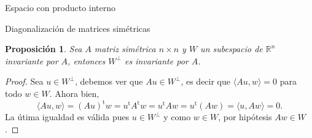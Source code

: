 \documentclass[a4paper,12pt,twoside,spanish]{amsbook}
\newtheorem{proposicion}[teorema]{Proposici\'on}
\theoremstyle{definition}
\newtheorem{ejemplo}{Ejemplo}[section]
\theoremstyle{remark}
\newcommand{\la}{\langle}
\newcommand{\ra}{\rangle}
\renewcommand{\t}{{\operatorname{t}}}
\newcommand{\R}{\mathbb R}
\begin{document}
\begin{chapter}{Espacio con producto interno}
\begin{section}{Diagonalización de matrices simétricas}
	
	
	\begin{proposicion}\label{wperpinv}
		Sea $A$ matriz simétrica $n \times n$ y $W$ un subespacio de $\R^n$ invariante por $A$, entonces $W^\perp$ es invariante por $A$.
	\end{proposicion}
	\begin{proof}
		Sea $u \in W^\perp$,  debemos ver que $Au \in W^\perp$,  es decir que $\la Au,w\ra =0$ para todo $w \in W$. Ahora bien,
		\begin{equation*}
			\la Au,w\ra =(Au)^\t w = u^\t A^\t w =u^\t A w = u^\t (A w) = \la u, Aw\ra=0.  
		\end{equation*}
		La útima igualdad es válida pues $u \in W^\perp$ y  como $w \in W$, por hipótesis $Aw \in W$.
	\end{proof}
	
	
	
 	\begin{comment}
 		\begin{proposicion} Sean $A$ y $B$ dos matrices simétricas. Entonces, $AB$  es simétrica si y sólo  si $A$ y $B$ conmutan. 
 		\end{proposicion}
 		\begin{proof}
 		($\Rightarrow$) Como $AB$ es simétrica, tenemos que $AB = (AB)^\t$. Por proposición \ref{prop-matriz-transpuesta} tenemos que  $(AB)^\t = B^\t A^\t$, y  como $A,B$ son simétricas, $B^\t A^\t = BA$. 
 		Reconstruyendo las igualdades tenemos
 		$$
 		AB = (AB)^\t = B^\t A^\t = BA,
 		$$
 		es decir, $A$ y $B$ conmutan.
 		
 		\vskip .3cm
 		
 		($\Leftarrow$)  
 		$$
 		(AB)^\t = B^\t A^\t = BA=AB.
 		$$
 		\end{proof}
 		
 		
 		\begin{ejemplo}
 		Sean 
 		\begin{equation*}
 		A = \begin{bmatrix} 1&0\\0&2 \end{bmatrix} \quad \text{ y } \quad B = \begin{bmatrix}0&1\\1&0\end{bmatrix}.
 		\end{equation*}
 		Tanto $A$ como $B$ son matrices simétricas. Sin embargo, 
 		\begin{align*}
 		AB = \begin{bmatrix}0&1\\2&0\end{bmatrix} 
 		\end{align*}
 		no es simétrica. Esto ocurre, pues $A$ y $B$ no conmutan. 
 		\end{ejemplo}
 		

\end{comment}
\end{section}
\end{chapter}
\end{document}
